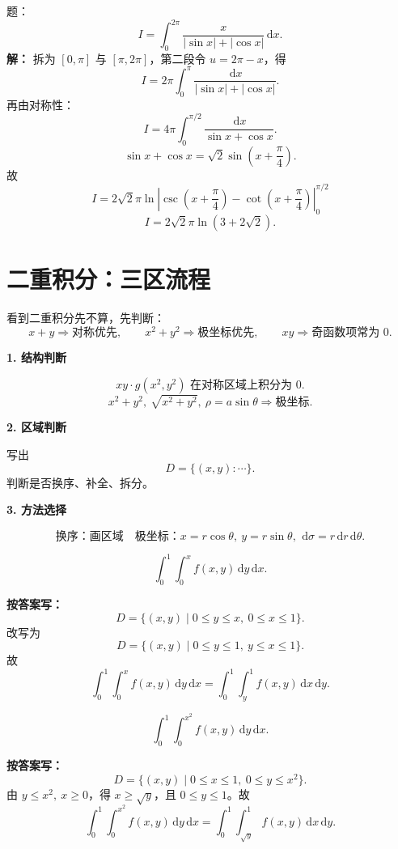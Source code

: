 \documentclass[11pt,a4paper,UTF8]{ctexart}
\newcommand{\dd}{\,\mathrm d}
\begin{document}
\begin{answerbox}[2022--2023 大题：含绝对值三角积分]
题：
\[
I=\int_0^{2\pi}\frac{x}{|\sin x|+|\cos x|}\dd x.
\]
\textbf{解：}
拆为 \([0,\pi]\) 与 \([\pi,2\pi]\)，第二段令 \(u=2\pi-x\)，得
\[
I=2\pi\int_0^\pi\frac{\dd x}{|\sin x|+|\cos x|}.
\]
再由对称性：
\[
I=4\pi\int_0^{\pi/2}\frac{\dd x}{\sin x+\cos x}.
\]
\[
\sin x+\cos x=\sqrt2\sin\left(x+\frac\pi4\right).
\]
故
\[
I=2\sqrt2\pi
\ln\left|\csc\left(x+\frac\pi4\right)-\cot\left(x+\frac\pi4\right)\right|_0^{\pi/2}
\]
\[
\boxed{I=2\sqrt2\pi\ln(3+2\sqrt2)}.
\]
\end{answerbox}
\section{二重积分：三区流程}

\begin{identifybox}[识别]
看到二重积分先不算，先判断：
\[
x+y \Rightarrow \text{对称优先},\qquad
x^2+y^2 \Rightarrow \text{极坐标优先},\qquad
xy \Rightarrow \text{奇函数项常为 }0.
\]
\end{identifybox}

\begin{templatebox}[三区流程]
\textbf{1. 结构判断}

\[
xy\cdot g(x^2,y^2)\text{ 在对称区域上积分为 }0.
\]
\[
x^2+y^2,\ \sqrt{x^2+y^2},\ \rho=a\sin\theta
\Rightarrow \text{极坐标}.
\]

\textbf{2. 区域判断}

写出
\[
D=\{(x,y):\cdots\}.
\]
判断是否换序、补全、拆分。

\textbf{3. 方法选择}

\[
\text{换序：画区域}\quad
\text{极坐标：}x=r\cos\theta,\ y=r\sin\theta,\ \dd\sigma=r\dd r\dd\theta.
\]
\end{templatebox}

\begin{answerbox}[例 1：换序，2024--2025]
\[
\int_0^1\int_0^x f(x,y)\dd y\dd x.
\]

\textbf{按答案写：}
\[
D=\{(x,y)\mid 0\le y\le x,\ 0\le x\le1\}.
\]
改写为
\[
D=\{(x,y)\mid 0\le y\le1,\ y\le x\le1\}.
\]
故
\[
\boxed{\int_0^1\int_0^x f(x,y)\dd y\dd x
=\int_0^1\int_y^1 f(x,y)\dd x\dd y.}
\]
\end{answerbox}

\begin{answerbox}[例 2：换序，2023--2024]
\[
\int_0^1\int_0^{x^2}f(x,y)\dd y\dd x.
\]

\textbf{按答案写：}
\[
D=\{(x,y)\mid 0\le x\le1,\ 0\le y\le x^2\}.
\]
由 \(y\le x^2,\ x\ge0\)，得 \(x\ge\sqrt y\)，且 \(0\le y\le1\)。故
\[
\boxed{
\int_0^1\int_0^{x^2}f(x,y)\dd y\dd x
=\int_0^1\int_{\sqrt y}^{1}f(x,y)\dd x\dd y.
}
\]
\end{answerbox}
\end{document}

